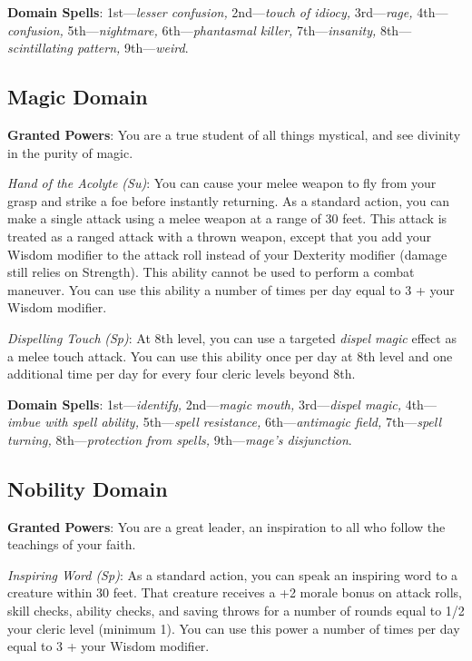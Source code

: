 \textbf{Domain Spells}: 1st---\textit{lesser confusion, }2nd---\textit{touch of idiocy,} 3rd---\textit{rage, }4th---\textit{confusion, }5th---\textit{nightmare, }6th---\textit{phantasmal killer, }7th---\textit{insanity, }8th---\textit{scintillating pattern, }9th---\textit{weird}.
				
\subsection{Magic Domain}

				
\textbf{Granted Powers}: You are a true student of all things mystical, and see divinity in the purity of magic.
				
\textit{Hand of the Acolyte (Su)}: You can cause your melee weapon to fly from your grasp and strike a foe before 
instantly returning. As a standard action, you can make a single attack using a melee weapon at a range of 30 feet.
This attack is treated as a ranged attack with a thrown weapon, except that you add your Wisdom modifier to the 
attack roll instead of your Dexterity modifier (damage still relies on Strength). This ability cannot be used to
perform a combat maneuver. You can use this ability a number of times per day equal to 3 + your Wisdom modifier.
				
\textit{Dispelling Touch} \textit{(Sp)}: At 8th level, you can use a targeted \textit{dispel magic} effect as a 
melee touch attack. You can use this ability once per day at 8th level and one additional time per day for every
four cleric levels beyond 8th.
				
\textbf{Domain Spells}: 1st---\textit{identify, }2nd---\textit{magic mouth,} 3rd---\textit{dispel magic, }4th---\textit{imbue with spell ability, }5th---\textit{spell resistance, }6th---\textit{antimagic field, }7th---\textit{spell turning, }8th---\textit{protection from spells, }9th---\textit{mage's disjunction}.
				
\subsection{Nobility Domain}

\textbf{Granted Powers}: You are a great leader, an inspiration to all who follow the teachings of your faith.

\textit{Inspiring Word (Sp)}: As a standard action, you can speak an inspiring word to a creature within 30 feet.
That creature receives a +2 morale bonus on attack rolls, skill checks, ability checks, and saving throws for a 
number of rounds equal to 1/2 your cleric level (minimum 1). You can use this power a number of times per day 
equal to 3 + your Wisdom modifier.

